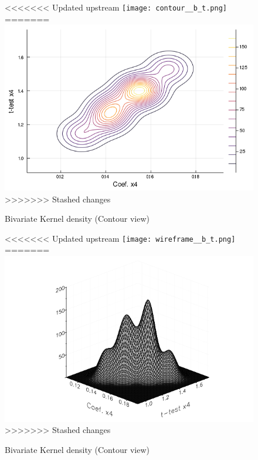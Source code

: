 \documentclass{article}
\begin{document}
\begin{figure}[!ht]
  \centering
  \begin{minipage}[b]{0.46\textwidth}
    \centering
<<<<<<< Updated upstream
    \texttt{[image: contour\_\_b\_t.png]}
=======
    \includegraphics[width=\textwidth]{contour_x4_b_t.png}
>>>>>>> Stashed changes
    \caption{Bivariate Kernel density (Contour view)}
  \end{minipage}
  \hfill
  \begin{minipage}[b]{0.53\textwidth}
    \centering
<<<<<<< Updated upstream
    \texttt{[image: wireframe\_\_b\_t.png]}
=======
    \includegraphics[width=\textwidth]{wireframe_x4_b_t.png}
>>>>>>> Stashed changes
    \caption{Bivariate Kernel density (Contour view)}
  \end{minipage}


\end{figure}
\end{document}
